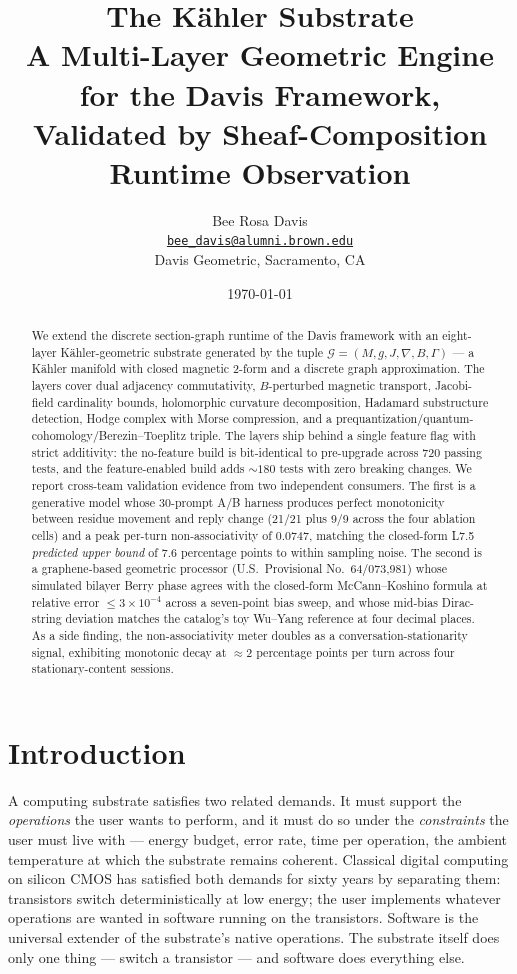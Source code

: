 \documentclass[11pt,letterpaper]{article}
\title{\textbf{The K\"ahler Substrate} \\[6pt]
\large A Multi-Layer Geometric Engine for the Davis Framework, \\
Validated by Sheaf-Composition Runtime Observation}
\author{Bee Rosa Davis \\
\href{mailto:bee_davis@alumni.brown.edu}{\nolinkurl{bee_davis@alumni.brown.edu}} \\
Davis Geometric, Sacramento, CA}
\date{\today}
\begin{document}
\maketitle

\begin{abstract}
\noindent We extend the discrete section-graph runtime of the
Davis framework with an eight-layer K\"ahler-geometric substrate
generated by the tuple $\mathcal{G} = (M, g, J, \nabla, B, \Gamma)$
--- a K\"ahler manifold with closed magnetic 2-form and a discrete
graph approximation. The layers cover dual adjacency commutativity,
$B$-perturbed magnetic transport, Jacobi-field cardinality bounds,
holomorphic curvature decomposition, Hadamard substructure
detection, Hodge complex with Morse compression, and a
prequantization/quantum-cohomology/Berezin--Toeplitz triple.
The layers ship behind a single feature flag with strict
additivity: the no-feature build is bit-identical to pre-upgrade
across 720 passing tests, and the feature-enabled build adds
$\sim 180$ tests with zero breaking changes. We report cross-team
validation evidence from two independent consumers. The first is a
generative model whose 30-prompt A/B harness produces perfect
monotonicity between residue movement and reply change (21/21 plus
9/9 across the four ablation cells) and a peak per-turn
non-associativity of $0.0747$, matching the closed-form L7.5
\emph{predicted upper bound} of $7.6$ percentage points to within
sampling noise.
The second is a graphene-based geometric processor (U.S.\
Provisional No.~64/073,981) whose simulated bilayer Berry phase
agrees with the closed-form McCann--Koshino formula at relative
error $\leq 3 \times 10^{-4}$ across a seven-point bias sweep, and
whose mid-bias Dirac-string deviation matches the catalog's toy
Wu--Yang reference at four decimal places. As a side finding, the
non-associativity meter doubles as a conversation-stationarity
signal, exhibiting monotonic decay at $\approx 2$ percentage points
per turn across four stationary-content sessions.
\end{abstract}

\tableofcontents
\bigskip


\section{Introduction}
\label{sec:intro}

A computing substrate satisfies two related demands. It must support
the \emph{operations} the user wants to perform, and it must do so
under the \emph{constraints} the user must live with --- energy
budget, error rate, time per operation, the ambient temperature at
which the substrate remains coherent. Classical digital computing on
silicon CMOS has satisfied both demands for sixty years by separating
them: transistors switch deterministically at low energy; the user
implements whatever operations are wanted in software running on the
transistors. Software is the universal extender of the substrate's
native operations. The substrate itself does only one thing --- switch
a transistor --- and software does everything else.
\end{document}
